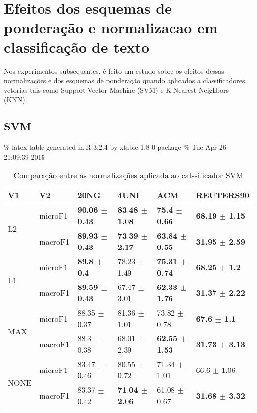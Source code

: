 \documentclass[]{article}
\begin{document}
\section{Efeitos dos esquemas de ponderação e normalizacao em
classificação de
texto}\label{efeitos-dos-esquemas-de-ponderacao-e-normalizacao-em-classificacao-de-texto}

Nos experimentos subsequentes, é feito um estudo sobre os efeitos dessas
normalizações e dos esquemas de ponderação quando aplicados a
classificadores vetorias tais como Support Vector Machine (SVM) e K
Nearest Neighbors (KNN).

\subsection{SVM}\label{svm-1}

\% latex table generated in R 3.2.4 by xtable 1.8-0 package \% Tue Apr
26 21:09:39 2016

\begin{table}[ht]
\centering
\begin{tabular}{llllll}
  \hline
V1 & V2 & 20NG & 4UNI & ACM & REUTERS90 \\ 
  \cline{3-6} \hline
\multirow{2}{*}{L2} & microF1 & \bf{90.06 $\pm$  0.43} & \bf{83.48 $\pm$  1.08} & \bf{75.4 $\pm$  0.66} & \bf{68.19 $\pm$  1.15} \\ 
   & macroF1 & \bf{89.93 $\pm$  0.43} & \bf{73.39 $\pm$  2.17} & \bf{63.84 $\pm$  0.55} & \bf{31.95 $\pm$  2.59} \\ 
   \cline{3-6}\multirow{2}{*}{L1} & microF1 & \bf{89.8 $\pm$  0.4} & 78.23 $\pm$  1.49 & \bf{75.31 $\pm$  0.74} & \bf{68.25 $\pm$  1.2} \\ 
   & macroF1 & \bf{89.59 $\pm$  0.43} & 67.47 $\pm$  3.01 & \bf{62.33 $\pm$  1.76} & \bf{31.37 $\pm$  2.22} \\ 
   \cline{3-6}\multirow{2}{*}{MAX} & microF1 & 88.35 $\pm$  0.37 & 81.36 $\pm$  1.01 & 73.82 $\pm$  0.78 & \bf{67.6 $\pm$  1.1} \\ 
   & macroF1 & 88.3 $\pm$  0.38 & 68.01 $\pm$  2.39 & \bf{62.55 $\pm$  1.53} & \bf{31.73 $\pm$  3.13} \\ 
   \cline{3-6}\multirow{2}{*}{NONE} & microF1 & 83.47 $\pm$  0.46 & 80.55 $\pm$  0.72 & 71.34 $\pm$  1.01 & 66.6 $\pm$  1.06 \\ 
   & macroF1 & 83.37 $\pm$  0.42 & \bf{71.04 $\pm$  2.06} & 61.08 $\pm$  0.67 & \bf{31.68 $\pm$  3.32} \\ 
   \cline{3-6}\end{tabular}
\caption{Comparação entre as normalizações aplicada ao calssificador SVM} 
\end{table}
\end{document}
